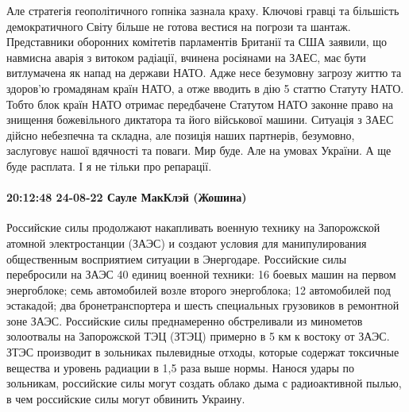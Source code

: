 Але стратегія геополітичного гопніка зазнала краху.
Ключові гравці та більшість демократичного Світу більше не готова вестися на погрози та шантаж.
Представники оборонних комітетів парламентів Британії та США заявили, що навмисна аварія з витоком радіації, вчинена росіянами на ЗАЕС, має бути витлумачена як напад на держави НАТО.
Адже несе безумовну загрозу життю та здоров’ю громадянам країн НАТО, а отже вводить в дію 5 статтю Статуту НАТО.
Тобто блок країн НАТО отримає передбачене Статутом НАТО законне право на знищення божевільного диктатора та його військової машини.
Ситуація з ЗАЕС дійсно небезпечна та складна, але позиція наших партнерів, безумовно, заслуговує нашої вдячності та поваги.
Мир буде. Але на умовах України.
А ще буде расплата. І я не тільки про репарації.

\paragraph{20:12:48 24-08-22 Сауле МакКлэй (Жошина)}

Российские силы продолжают накапливать военную технику на Запорожской атомной
электростанции (ЗАЭС) и создают условия для манипулирования общественным
восприятием ситуации в Энергодаре. Российские силы перебросили на ЗАЭС 40
единиц военной техники: 16 боевых машин на первом энергоблоке; семь автомобилей
возле второго энергоблока; 12 автомобилей под эстакадой; два бронетранспортера
и шесть специальных грузовиков в ремонтной зоне ЗАЭС. Российские силы
преднамеренно обстреливали из минометов золоотвалы на Запорожской ТЭЦ (ЗТЭЦ)
примерно в 5 км к востоку от ЗАЭС. ЗТЭС производит в зольниках пылевидные
отходы, которые содержат токсичные вещества и уровень радиации в 1,5 раза выше
нормы. Нанося удары по зольникам, российские силы могут создать облако дыма с
радиоактивной пылью, в чем российские силы могут обвинить Украину.

